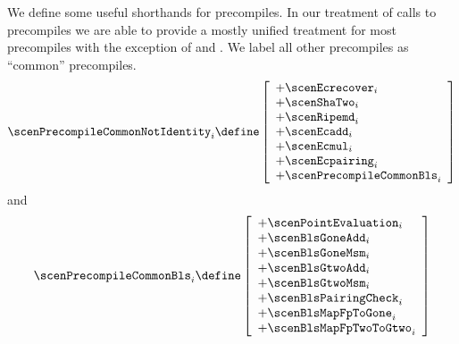 We define some useful shorthands for precompiles.
In our treatment of calls to precompiles we are able to provide a mostly unified treatment for most precompiles with the exception of  and .
We label all other precompiles as ``common'' precompiles.
\[
	\scenPrecompileCommonNotIdentity _{i}
	\define
	\left[ \begin{array}{l}
		+ \scenEcrecover       _{i} \\
		+ \scenShaTwo          _{i} \\
		+ \scenRipemd          _{i} \\
		+ \scenEcadd           _{i} \\
		+ \scenEcmul           _{i} \\
		+ \scenEcpairing       _{i} \\
		+ \scenPrecompileCommonBls _{i} \\
	\end{array} \right]
\]
and
\[
	\scenPrecompileCommonBls _{i}
	\define
	\left[ \begin{array}{l}
		+ \scenPointEvaluation    _{i} \\
		+ \scenBlsGoneAdd         _{i} \\
		+ \scenBlsGoneMsm         _{i} \\
		+ \scenBlsGtwoAdd         _{i} \\
		+ \scenBlsGtwoMsm         _{i} \\
		+ \scenBlsPairingCheck    _{i} \\
		+ \scenBlsMapFpToGone     _{i} \\
		+ \scenBlsMapFpTwoToGtwo  _{i} \\
	\end{array} \right]
\]
